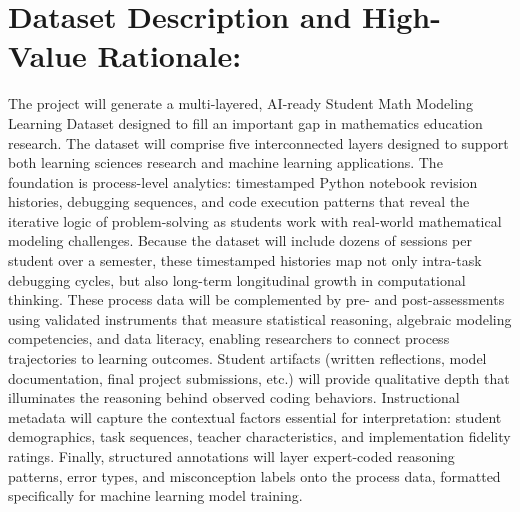 \documentclass[11pt]{article}
\begin{document}

\section{Dataset Description and High-Value Rationale:}
\label{sec:dataset}

The project will generate a multi-layered, AI-ready Student Math Modeling Learning Dataset designed to fill an important gap in mathematics education research. 
The dataset will comprise five interconnected layers designed to support both learning sciences research and machine learning applications.
The foundation is process-level analytics: timestamped Python notebook revision histories, debugging sequences, and code execution patterns that reveal the iterative logic of problem-solving as students work with real-world mathematical modeling challenges.
Because the dataset will include dozens of sessions per student over a semester, these timestamped histories map not only intra-task debugging cycles, but also long-term longitudinal growth in computational thinking.
These process data will be complemented by pre- and post-assessments using validated instruments that measure statistical reasoning, algebraic modeling competencies, and data literacy, enabling researchers to connect process trajectories to learning outcomes. 
Student artifacts (written reflections, model documentation, final project submissions, etc.) will provide qualitative depth that illuminates the reasoning behind observed coding behaviors.
Instructional metadata will capture the contextual factors essential for interpretation: student demographics, task sequences, teacher characteristics, and implementation fidelity ratings.
Finally, structured annotations will layer expert-coded reasoning patterns, error types, and misconception labels onto the process data, formatted specifically for machine learning model training.
\end{document}
